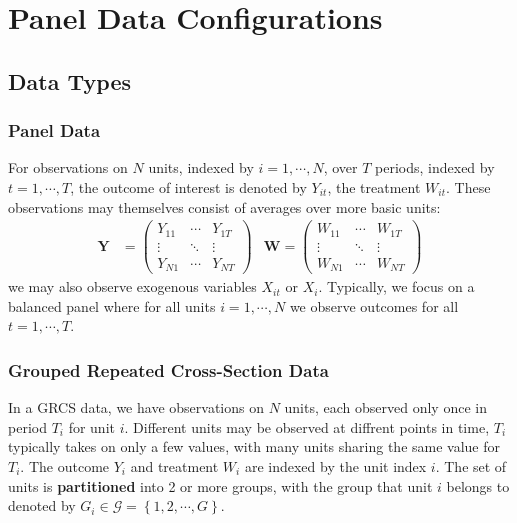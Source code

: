 \documentclass[twoside]{article}
\begin{document}

\section{Panel Data Configurations}

\subsection{Data Types}
\subsubsection{Panel Data}
For observations on $N$ units, indexed by $i=1,\cdots,N$, over $T$ periods, indexed by $t=1,\cdots,T$, the outcome of interest is denoted by $Y_{it}$, the treatment $W_{it}$.
These observations may themselves consist of averages over more basic units:
\begin{align*}
    \mathbf{Y} &= \begin{pmatrix}
        Y_{11} & \cdots & Y_{1T}\\
        \vdots & \ddots & \vdots \\
        Y_{N1} & \cdots & Y_{NT}
    \end{pmatrix} &
    \mathbf{W} = \begin{pmatrix}
        W_{11} & \cdots & W_{1T}\\
        \vdots & \ddots & \vdots \\
        W_{N1} & \cdots & W_{NT}
    \end{pmatrix}
\end{align*}
we may also observe exogenous variables $X_{it}$ or $X_i$. Typically, we focus on a balanced panel where for all units $i=1,\cdots,N$ we observe outcomes for all $t=1,\cdots,T$.

\subsubsection{Grouped Repeated Cross-Section Data}
In a GRCS data, we have observations on $N$ units, each observed only once in period $T_i$ for unit $i$. Different units may be observed at diffrent points in time, $T_i$ typically takes on only a few values, with many units sharing the same value for $T_i$. The outcome $Y_i$ and treatment $W_i$ are indexed by the unit index $i$.
The set of units is \textbf{partitioned} into 2 or more groups, with the group that unit $i$ belongs to denoted by $G_i\in \mathcal{G}=\left\{1,2,\cdots,G\right\}$.
\end{document}
